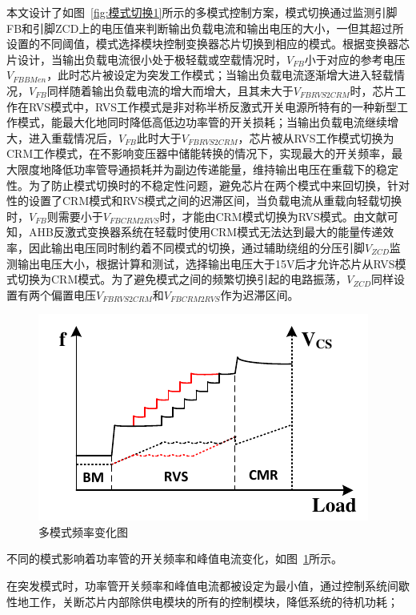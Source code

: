 本文设计了如图~\ref{fig:模式切换1}所示的多模式控制方案，模式切换通过监测引脚FB和引脚ZCD上的电压值来判断输出负载电流和输出电压的大小，一但其超过所设置的不同阈值，模式选择模块控制变换器芯片切换到相应的模式。根据变换器芯片设计，当输出负载电流很小处于极轻载或空载情况时，$V_{FB}$小于对应的参考电压$V_{FBBMen}$，此时芯片被设定为突发工作模式；当输出负载电流逐渐增大进入轻载情况，$V_{FB}$同样随着输出负载电流的增大而增大，且其未大于$V_{FBRVS2CRM}$时，芯片工作在RVS模式中，RVS工作模式是非对称半桥反激式开关电源所特有的一种新型工作模式，能最大化地同时降低高低边功率管的开关损耗；当输出负载电流继续增大，进入重载情况后，$V_{FB}$此时大于$V_{FBRVS2CRM}$，芯片被从RVS工作模式切换为CRM工作模式，在不影响变压器中储能转换的情况下，实现最大的开关频率，最大限度地降低功率管导通损耗并为副边传递能量，维持输出电压在重载下的稳定性。为了防止模式切换时的不稳定性问题，避免芯片在两个模式中来回切换，针对性的设置了CRM模式和RVS模式之间的迟滞区间，当负载电流从重载向轻载切换时，$V_{FB}$则需要小于$V_{FBCRM2RVS}$时，才能由CRM模式切换为RVS模式。由文献可知，AHB反激式变换器系统在轻载时使用CRM模式无法达到最大的能量传递效率，因此输出电压同时制约着不同模式的切换，通过辅助绕组的分压引脚$V_{ZCD}$监测输出电压大小，根据计算和测试，选择输出电压大于15V后才允许芯片从RVS模式切换为CRM模式。为了避免模式之间的频繁切换引起的电路振荡，$V_{ZCD}$同样设置有两个偏置电压$V_{FBRVS2CRM}$和$V_{FBCRM2RVS}$作为迟滞区间。

\begin{figure}[htbp] 
    \centering
    \includegraphics[width=0.8\linewidth]{figures/模式切换2.pdf}
    \caption{多模式频率变化图}
    \label{fig:模式切换2}
\end{figure}

不同的模式影响着功率管的开关频率和峰值电流变化，如图~\ref{fig:模式切换2}所示。

在突发模式时，功率管开关频率和峰值电流都被设定为最小值，通过控制系统间歇性地工作，关断芯片内部除供电模块的所有的控制模块，降低系统的待机功耗；

